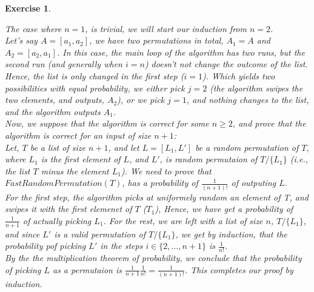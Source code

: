 \documentclass{article}
\newtheorem{exo}{Exercise}
\begin{document}
\begin{exo}{\ \\}

The case where $n=1$, is trivial, we will start our induction from $n=2$. \\


Let's say $A = [a_1, a_2]$, we have two permutations in total, $A_1 = A$ and $A_2 = [a_2, a_1]$. In this case, the main loop of the algorithm has two runs, but the second run (and generally when $i=n$) doesn't not change the outcome of the list. Hence, the list is only changed in the first step ($i = 1$). Which yields two possibilities with equal probability, we either pick $j=2$ (the algorithm swipes the two elements, and outputs, $A_2$), or we pick $j=1$, and nothing changes to the list, and the algorithm outputs $A_1$. \\


Now, we suppose that the algorithm is correct for some $n \geq 2$, and prove that the algorithm is correct for an input of size $n+1$: \\

Let, $T$ be a list of size $n+1$, and let $L =  [L_1,L']$ be a random permutation of $T$, where $L_1$ is the first element of $L$, and $L'$, is random permutaion of $T/\{L_1\}$ (i.e., the list $T$ minus the element $L_1$). We need to prove that $FastRandomPermutation(T)$, has a probability of $\frac{1}{(n+1)!}$ of outputing $L$.  \\

For the first step, the algorithm picks at uniformely random an element of T, and swipes it with the first elemenet of $T$ ($T_1$), Hence, we have get a probability of $\frac{1}{n+1}$  of actually picking $L_1$. For the rest, we are left with a list of size $n$, $T/\{L_1\}$, and since $L'$ is a valid permutation of $T/\{L_1\}$, we get by induction, that the probability pof picking $L'$ in the steps $i \in \{2,\dots , n+1\}$ is $\frac{1}{n!}$. \\

By the the multiplication theorem of probability, we conclude that the probability of picking $L$ as a permutaion is $\frac{1}{n+1} \frac{1}{n!} = \frac{1}{(n+1)!}$. This completes our proof by induction.
 
\end{exo}
\end{document}
